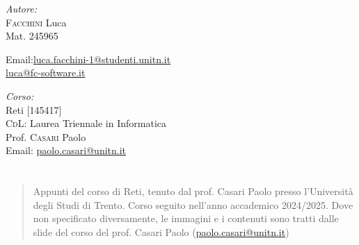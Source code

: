 \documentclass[a4paper,twoside]{report}
\makeatletter
\renewenvironment{abstract}{%
    \if@twocolumn
        \section*{\abstractname}%
    \else
        \begin{center}%
            {\bfseries \abstractname\vspace{-.5em}\vspace{\z@}}%
        \end{center}%
        \small
        \begin{quotation}
    \fi}
    {\if@twocolumn\else\end{quotation}\fi}
\makeatother
\begin{document}
\begin{titlepage}
        \vfill
        \begin{minipage}[t]{0.4\textwidth}
            \begin{flushleft} \normalsize
                \emph{Autore:}\\
                \textsc{Facchini} Luca \\ %
                Mat. 245965 \\
                \vspace{-\baselineskip}
                \begin{tabbing}
                    Email:\= \href{mailto:luca.facchini-1@studenti.unitn.it}{luca.facchini-1@studenti.unitn.it} \\
                        \>  \href{mailto:luca@fc-software.it}{luca@fc-software.it}
                \end{tabbing}
            \end{flushleft}
        \end{minipage}%
        \hfill
        \begin{minipage}[t]{0.4\textwidth}
            \begin{flushleft} \normalsize
                \emph{Corso:}\\
                Reti [145417] \\
                \textsc{CdL}: Laurea Triennale in Informatica \\
                Prof. \textsc{Casari} Paolo \\
                Email: \href{mailto:paolo.casari@unitn.it}{paolo.casari@unitn.it}
            \end{flushleft}
        \end{minipage}
        \vfill
        \begin{abstract}
            Appunti del corso di Reti, tenuto dal prof. Casari Paolo presso l'Università degli Studi di Trento. Corso seguito nell'anno accademico 2024/2025.\newline
            Dove non specificato diversamente, le immagini e i contenuti sono tratti dalle slide del corso del prof. Casari Paolo (\href{mailto:paolo.casari@unitn.it}{paolo.casari@unitn.it})
        \end{abstract}
        
    \end{titlepage}
    \begingroup
        \pagestyle{tocStyle}
        \tableofcontents
    \endgroup
    \thispagestyle{tocStyle}
    \pagestyle{stdPage}
    
    \newpage
    
    
    
    
    
    
    
    \appendix
    
    
\end{document}
